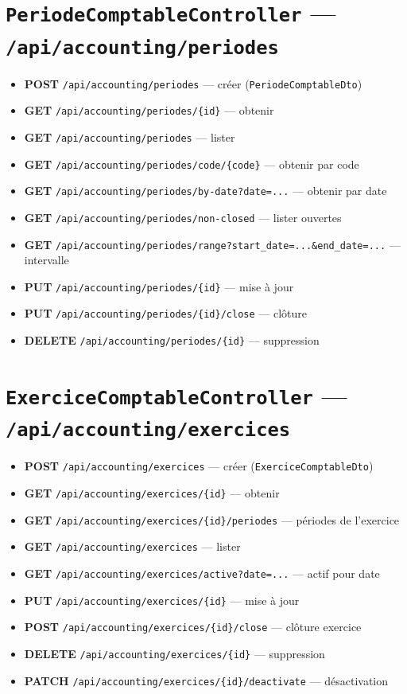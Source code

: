 \section{\texttt{PeriodeComptableController} --- \texttt{/api/accounting/periodes}}
\begin{itemize}
  \item \textbf{POST} \texttt{/api/accounting/periodes} --- créer (\texttt{PeriodeComptableDto})
  \item \textbf{GET} \texttt{/api/accounting/periodes/\{id\}} --- obtenir
  \item \textbf{GET} \texttt{/api/accounting/periodes} --- lister
  \item \textbf{GET} \texttt{/api/accounting/periodes/code/\{code\}} --- obtenir par code
  \item \textbf{GET} \texttt{/api/accounting/periodes/by-date?date=...} --- obtenir par date
  \item \textbf{GET} \texttt{/api/accounting/periodes/non-closed} --- lister ouvertes
  \item \textbf{GET} \texttt{/api/accounting/periodes/range?start\_date=...\&end\_date=...} --- intervalle
  \item \textbf{PUT} \texttt{/api/accounting/periodes/\{id\}} --- mise à jour
  \item \textbf{PUT} \texttt{/api/accounting/periodes/\{id\}/close} --- clôture
  \item \textbf{DELETE} \texttt{/api/accounting/periodes/\{id\}} --- suppression
\end{itemize}

\section{\texttt{ExerciceComptableController} --- \texttt{/api/accounting/exercices}}
\begin{itemize}
  \item \textbf{POST} \texttt{/api/accounting/exercices} --- créer (\texttt{ExerciceComptableDto})
  \item \textbf{GET} \texttt{/api/accounting/exercices/\{id\}} --- obtenir
  \item \textbf{GET} \texttt{/api/accounting/exercices/\{id\}/periodes} --- périodes de l'exercice
  \item \textbf{GET} \texttt{/api/accounting/exercices} --- lister
  \item \textbf{GET} \texttt{/api/accounting/exercices/active?date=...} --- actif pour date
  \item \textbf{PUT} \texttt{/api/accounting/exercices/\{id\}} --- mise à jour
  \item \textbf{POST} \texttt{/api/accounting/exercices/\{id\}/close} --- clôture exercice
  \item \textbf{DELETE} \texttt{/api/accounting/exercices/\{id\}} --- suppression
  \item \textbf{PATCH} \texttt{/api/accounting/exercices/\{id\}/deactivate} --- désactivation
\end{itemize}

